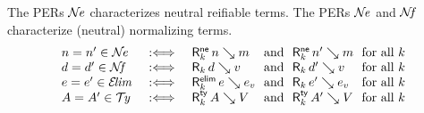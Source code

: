 \documentclass[acmlarge,review,anonymous]{acmart}\settopmatter{printfolios=true}
\begin{document}
The PERs $\mathcal{N}\!\mathit{e}$ characterizes neutral reifiable terms.
The PERs $\mathcal{N}\!\mathit{e}$ and $\mathcal{N}\!\mathit{f}$ characterize (neutral) normalizing terms.
\[
\begin{array}{l@{\quad}l@{\quad}l@{~}l@{~}l@{~}l@{~}l@{~}l}
  n = n' \in \NE
    & \defas &
    \RNe k n m &\mand& \RNe k {n'} {m} &\mforall k \\
  d = d' \in \NF
    & \defas &
    \R k d v &\mand& \R k {d'} {v} &\mforall k \\
  e = e' \in \ELIM
    & \defas &
    \RElim k e e_v &\mand& \R k {e'} {e_v} &\mforall k \\
  A = A' \in \TY
    & \defas &
    \RTy k A V &\mand& \RTy k {A'} {V} &\mforall k \\
\end{array}
\]
\end{document}
